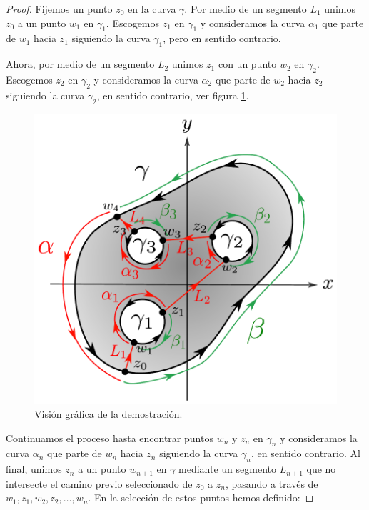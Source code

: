 \begin{proof}
Fijemos un punto $z_0$ en la curva $\gamma$. Por medio de un segmento $L_1$ unimos $z_0$ a un punto $w_1$ en $\gamma_1$. Escogemos $z_1$ en $\gamma_1$ y consideramos la curva $\alpha_1$ que parte de $w_1$ hacia $z_1$ siguiendo la curva $\gamma_1$, pero en sentido contrario. 

Ahora, por medio de un segmento $L_2$ unimos $z_1$ con un punto $w_2$ en $\gamma_2$. Escogemos $z_2$ en $\gamma_2$ y consideramos la curva $\alpha_2$ que parte de $w_2$ hacia $z_2$ siguiendo la curva $\gamma_2$, en sentido contrario, ver figura \ref{fig:GeneralTCG}.

\begin{figure}[H]
    \centering
    \includegraphics[scale = 0.52]{Figuras/GeneralTCG.pdf}
    \caption{Visión gráfica de la demostración.}
    \label{fig:GeneralTCG}
\end{figure}

Continuamos el proceso hasta encontrar puntos $w_n$ y $z_n$ en $\gamma_n$ y consideramos la curva $\alpha_n$ que parte de $w_n$ hacia $z_n$ siguiendo la curva $\gamma_n$, en sentido contrario. Al final, unimos $z_n$ a un punto $w_{n+1}$ en $\gamma$ mediante un segmento $L_{n+1}$ que no intersecte el camino previo seleccionado de $z_0$ a $z_n$, pasando a través de $w_1, z_1, w_2, z_2, \dots, w_n$. En la selección de estos puntos hemos definido:


\end{proof}
